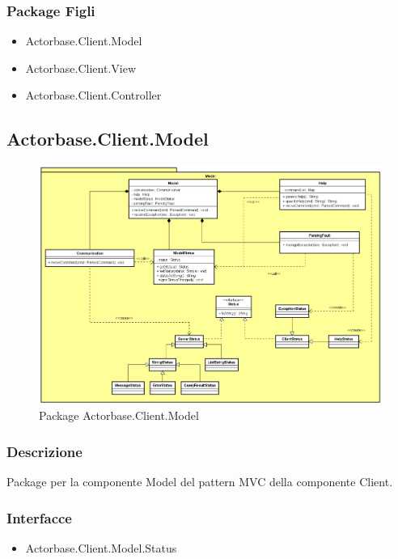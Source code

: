 \documentclass[a4paper]{article}
\begin{document}
		\subsubsection{Package Figli}
			\begin{itemize}
				\item Actorbase.Client.Model
				\item Actorbase.Client.View
				\item Actorbase.Client.Controller
			\end{itemize}
			
	\subsection{Actorbase.Client.Model}
		\begin{figure} [H]
			\centering
			\includegraphics[scale=0.42]{ST/Client/ModelClasses.png}
        	\caption{Package Actorbase.Client.Model}
		\end{figure}
		\subsubsection{Descrizione}
			Package per la componente Model del pattern MVC della componente Client.
		\subsubsection{Interfacce}
			\begin{itemize}
				\item Actorbase.Client.Model.Status
			\end{itemize}
\end{document}
